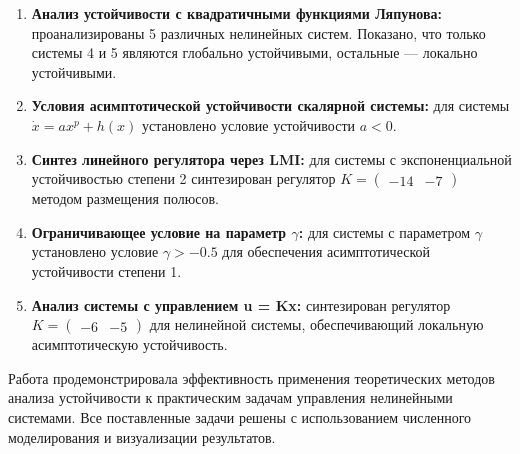 \begin{enumerate}
\item \textbf{Анализ устойчивости с квадратичными функциями Ляпунова:} проанализированы 5 различных нелинейных систем. Показано, что только системы 4 и 5 являются глобально устойчивыми, остальные — локально устойчивыми.

\item \textbf{Условия асимптотической устойчивости скалярной системы:} для системы $\dot{x} = ax^p + h(x)$ установлено условие устойчивости $a < 0$.

\item \textbf{Синтез линейного регулятора через LMI:} для системы с экспоненциальной устойчивостью степени 2 синтезирован регулятор $K = \begin{pmatrix} -14 & -7 \end{pmatrix}$ методом размещения полюсов.

\item \textbf{Ограничивающее условие на параметр $\gamma$:} для системы с параметром $\gamma$ установлено условие $\gamma > -0.5$ для обеспечения асимптотической устойчивости степени 1.

\item \textbf{Анализ системы с управлением u = Kx:} синтезирован регулятор $K = \begin{pmatrix} -6 & -5 \end{pmatrix}$ для нелинейной системы, обеспечивающий локальную асимптотическую устойчивость.
\end{enumerate}

Работа продемонстрировала эффективность применения теоретических методов анализа устойчивости к практическим задачам управления нелинейными системами. Все поставленные задачи решены с использованием численного моделирования и визуализации результатов.

